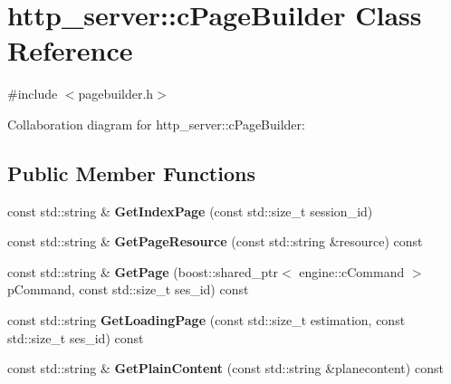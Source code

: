 \hypertarget{classhttp__server_1_1cPageBuilder}{\section{http\-\_\-server\-:\-:c\-Page\-Builder Class Reference}
\label{classhttp__server_1_1cPageBuilder}
}


{\ttfamily \#include $<$pagebuilder.\-h$>$}



Collaboration diagram for http\-\_\-server\-:\-:c\-Page\-Builder\-:
\subsection*{Public Member Functions}
\begin{DoxyCompactItemize}
\item 
\hypertarget{classhttp__server_1_1cPageBuilder_a045ba157650645c9b2790389618f98d3}{const std\-::string \& {\bfseries Get\-Index\-Page} (const std\-::size\-\_\-t session\-\_\-id)}\label{classhttp__server_1_1cPageBuilder_a045ba157650645c9b2790389618f98d3}

\item 
\hypertarget{classhttp__server_1_1cPageBuilder_ac7a52ef639767e3f9297376cced2a8ab}{const std\-::string \& {\bfseries Get\-Page\-Resource} (const std\-::string \&resource) const }\label{classhttp__server_1_1cPageBuilder_ac7a52ef639767e3f9297376cced2a8ab}

\item 
\hypertarget{classhttp__server_1_1cPageBuilder_acdebd7b2369bcd3bf6859b3b249b8c3c}{const std\-::string \& {\bfseries Get\-Page} (boost\-::shared\-\_\-ptr$<$ engine\-::c\-Command $>$ p\-Command, const std\-::size\-\_\-t ses\-\_\-id) const }\label{classhttp__server_1_1cPageBuilder_acdebd7b2369bcd3bf6859b3b249b8c3c}

\item 
\hypertarget{classhttp__server_1_1cPageBuilder_a510f14c10b161fa8b38d5ec52c7340e4}{const std\-::string {\bfseries Get\-Loading\-Page} (const std\-::size\-\_\-t estimation, const std\-::size\-\_\-t ses\-\_\-id) const }\label{classhttp__server_1_1cPageBuilder_a510f14c10b161fa8b38d5ec52c7340e4}

\item 
\hypertarget{classhttp__server_1_1cPageBuilder_a796f41711bd67b135dd74b8843b4c129}{const std\-::string \& {\bfseries Get\-Plain\-Content} (const std\-::string \&planecontent) const }\label{classhttp__server_1_1cPageBuilder_a796f41711bd67b135dd74b8843b4c129}

\end{DoxyCompactItemize}
